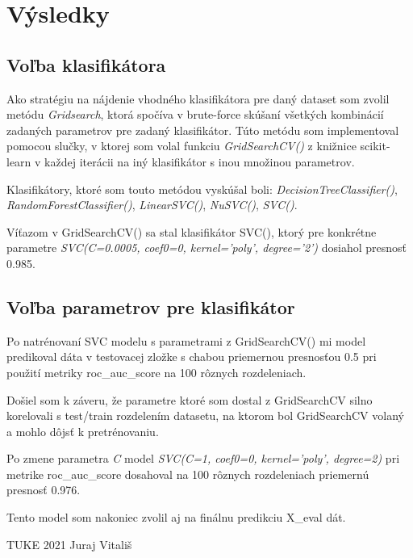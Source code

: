 \documentclass[12pt]{article}
\begin{document}
    \newpage
    \thispagestyle{empty}

    \section{Výsledky}

    \subsection{Voľba klasifikátora}
    Ako stratégiu na nájdenie vhodného klasifikátora pre daný dataset som zvolil metódu
    \emph{Gridsearch}, ktorá spočíva v brute-force skúšaní všetkých kombinácií zadaných parametrov
    pre zadaný klasifikátor.
    Túto metódu som implementoval pomocou slučky, v ktorej som volal funkciu \emph{GridSearchCV()} z knižnice
    scikit-learn v každej iterácii na iný klasifikátor s inou množinou parametrov.

    Klasifikátory, ktoré som touto metódou vyskúšal boli:
    \emph{DecisionTreeClassifier()},
    \emph{RandomForestClassifier()},
    \emph{LinearSVC()},
    \emph{NuSVC()},
    \emph{SVC()}.

    Víťazom v GridSearchCV() sa stal klasifikátor SVC(), ktorý 
    pre konkrétne parametre \emph{SVC(C=0.0005, coef0=0, kernel='poly', degree='2')}
    dosiahol presnosť 0.985.

    \subsection{Voľba parametrov pre klasifikátor}
    Po natrénovaní SVC modelu s parametrami z GridSearchCV() mi model predikoval dáta v 
    testovacej zložke s chabou priemernou presnosťou 0.5 pri použití metriky roc\_auc\_score
    na 100 rôznych rozdeleniach.

    Došiel som k záveru, že parametre ktoré som dostal z GridSearchCV silno korelovali s 
    test/train rozdelením datasetu, na ktorom bol GridSearchCV volaný a mohlo dôjsť k pretrénovaniu.

    Po zmene parametra \emph{C} model \emph{SVC(C=1, coef0=0, kernel='poly', degree=2)} pri metrike roc\_auc\_score 
    dosahoval na 100 rôznych rozdeleniach priemernú presnosť 0.976.

    Tento model som nakoniec zvolil aj na finálnu predikciu X\_eval dát.


    \vfill
    TUKE 2021
    \hfill
    Juraj Vitališ
\end{document}
